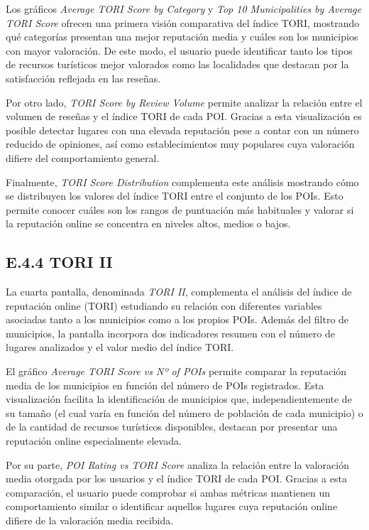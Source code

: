 Los gráficos \textit{Average TORI Score by Category} y \textit{Top 10 Municipalities by Average TORI Score} ofrecen una primera visión comparativa del índice TORI, mostrando qué categorías presentan una mejor reputación media y cuáles son los municipios con mayor valoración. De este modo, el usuario puede identificar tanto los tipos de recursos turísticos mejor valorados como las localidades que destacan por la satisfacción reflejada en las reseñas.

Por otro lado, \textit{TORI Score by Review Volume} permite analizar la relación entre el volumen de reseñas y el índice TORI de cada POI. Gracias a esta visualización es posible detectar lugares con una elevada reputación pese a contar con un número reducido de opiniones, así como establecimientos muy populares cuya valoración difiere del comportamiento general.

Finalmente, \textit{TORI Score Distribution} complementa este análisis mostrando cómo se distribuyen los valores del índice TORI entre el conjunto de los POIs. Esto permite conocer cuáles son los rangos de puntuación más habituales y valorar si la reputación online se concentra en niveles altos, medios o bajos.


\subsection{E.4.4 TORI II}
La cuarta pantalla, denominada \textit{TORI II}, complementa el análisis del índice de reputación online (TORI) estudiando su relación con diferentes variables asociadas tanto a los municipios como a los propios POIs. Además del filtro de municipios, la pantalla incorpora dos indicadores resumen con el número de lugares analizados y el valor medio del índice TORI.

El gráfico \textit{Average TORI Score vs Nº of POIs} permite comparar la reputación media de los municipios en función del número de POIs registrados. Esta visualización facilita la identificación de municipios que, independientemente de su tamaño (el cual varía en función del número de población de cada municipio) o de la cantidad de recursos turísticos disponibles, destacan por presentar una reputación online especialmente elevada.

Por su parte, \textit{POI Rating vs TORI Score} analiza la relación entre la valoración media otorgada por los usuarios y el índice TORI de cada POI. Gracias a esta comparación, el usuario puede comprobar si ambas métricas mantienen un comportamiento similar o identificar aquellos lugares cuya reputación online difiere de la valoración media recibida.


